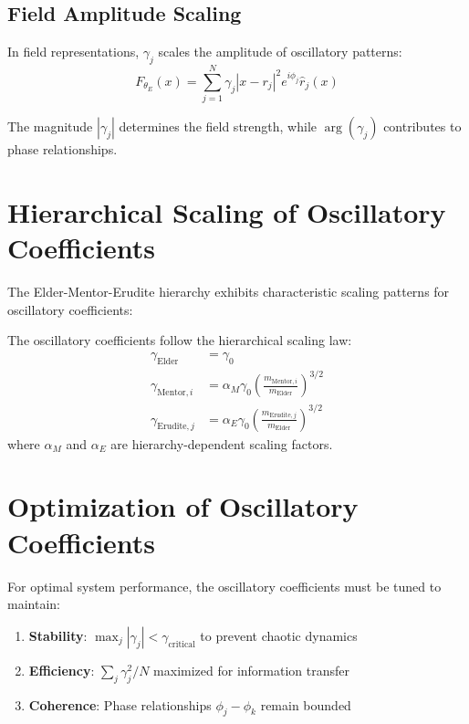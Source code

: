 \subsection{Field Amplitude Scaling}

In field representations, $\gamma_j$ scales the amplitude of oscillatory patterns:
\begin{equation}
F_{\theta_E}(x) = \sum_{j=1}^N \gamma_j |x - r_j|^2 e^{i\phi_j} \hat{r}_j(x)
\end{equation}

The magnitude $|\gamma_j|$ determines the field strength, while $\arg(\gamma_j)$ contributes to phase relationships.

\section{Hierarchical Scaling of Oscillatory Coefficients}

The Elder-Mentor-Erudite hierarchy exhibits characteristic scaling patterns for oscillatory coefficients:

\begin{proposition}
The oscillatory coefficients follow the hierarchical scaling law:
\begin{align}
\gamma_{\text{Elder}} &= \gamma_0 \\
\gamma_{\text{Mentor},i} &= \alpha_M \gamma_0 \left(\frac{m_{\text{Mentor},i}}{m_{\text{Elder}}}\right)^{3/2} \\
\gamma_{\text{Erudite},j} &= \alpha_E \gamma_0 \left(\frac{m_{\text{Erudite},j}}{m_{\text{Elder}}}\right)^{3/2}
\end{align}
where $\alpha_M$ and $\alpha_E$ are hierarchy-dependent scaling factors.
\end{proposition}

\section{Optimization of Oscillatory Coefficients}

For optimal system performance, the oscillatory coefficients must be tuned to maintain:

\begin{enumerate}
    \item \textbf{Stability}: $\max_j |\gamma_j| < \gamma_{\text{critical}}$ to prevent chaotic dynamics
    \item \textbf{Efficiency}: $\sum_j \gamma_j^2 / N$ maximized for information transfer
    \item \textbf{Coherence}: Phase relationships $\phi_j - \phi_k$ remain bounded
\end{enumerate}

